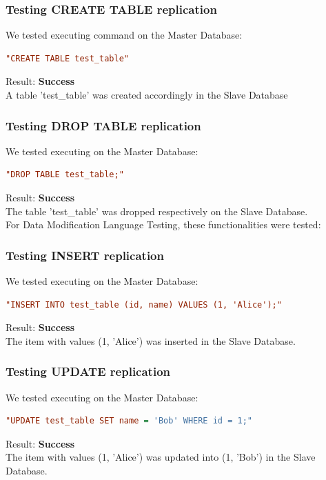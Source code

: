 \documentclass[a4paper,12pt]{report}
\begin{document}
\subsubsection{Testing CREATE TABLE replication }
We tested executing command on the Master Database:
\begin{lstlisting}[language=ini, numbers=none]
"CREATE TABLE test_table" 
\end{lstlisting}
Result: \textbf{Success}
\\
A table 'test\_table' was created accordingly in the Slave Database

\subsubsection{Testing DROP TABLE replication }
We tested executing on the Master Database:
\begin{lstlisting}[language=ini, numbers=none]
"DROP TABLE test_table;"
\end{lstlisting}
Result: \textbf{Success}
\\
The table 'test\_table' was dropped respectively on the Slave Database.
\vspace{1\baselineskip}
\\
For Data Modification Language Testing, these functionalities were tested:
\subsubsection{Testing INSERT replication }
We tested executing on the Master Database:
\begin{lstlisting}[language=ini, numbers=none]
"INSERT INTO test_table (id, name) VALUES (1, 'Alice');"
\end{lstlisting}
Result: \textbf{Success}
\\
The item with values (1, 'Alice') was inserted in the Slave Database.

\subsubsection{Testing UPDATE replication }
We tested executing on the Master Database:
\begin{lstlisting}[language=ini, numbers=none]
"UPDATE test_table SET name = 'Bob' WHERE id = 1;"
\end{lstlisting}
Result: \textbf{Success}
\\
The item with values (1, 'Alice') was updated into (1, 'Bob') in the Slave Database.
\end{document}
